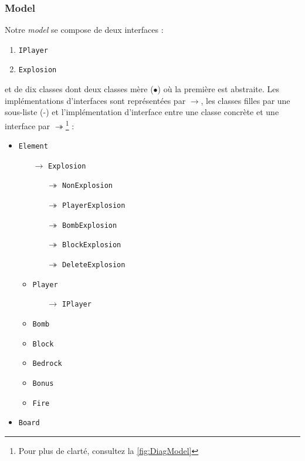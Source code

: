         
        \subsubsection{Model}
        Notre \textit{model} se compose de deux interfaces :
  		\begin{multicols}{2}
        \begin{enumerate}
            \item \texttt{IPlayer}
            \item \texttt{Explosion}
        \end{enumerate}
	    \end{multicols}
	    et de dix classes dont deux classes mère ($\bullet$) où la première est 
	    abstraite. Les implémentations d'interfaces sont représentées par $\rightarrow$, 
	    les classes filles par une sous-liste (-) et l'implémentation d'interface entre
        une classe concrète et une interface par $\twoheadrightarrow$\footnote{Pour 
        plus de clarté, consultez la \autoref{fig:DiagModel}} :
	    \begin{multicols}{2}
        \begin{itemize}

            \item \texttt{Element}
            \begin{itemize}
            \item[$\rightarrow$] \texttt{Explosion}
				\begin{itemize}
				\item[$\twoheadrightarrow$] \texttt{NonExplosion}
				\item[$\twoheadrightarrow$] \texttt{PlayerExplosion}
				\item[$\twoheadrightarrow$]	 \texttt{BombExplosion}
				\item[$\twoheadrightarrow$]	 \texttt{BlockExplosion}
				\item[$\twoheadrightarrow$]	 \texttt{DeleteExplosion}			
							
				\end{itemize}				            
            
            
	        \item \texttt{Player}
	        \begin{itemize}
	        \item[$\rightarrow$]	 \texttt{IPlayer}	
	        \end{itemize}
            \item \texttt{Bomb}
            \item \texttt{Block}
            \item \texttt{Bedrock}
            \item \texttt{Bonus}
            \item \texttt{Fire}
            \end{itemize}
            \item \texttt{Board}
        
        \end{itemize}
        \end{multicols}
        
